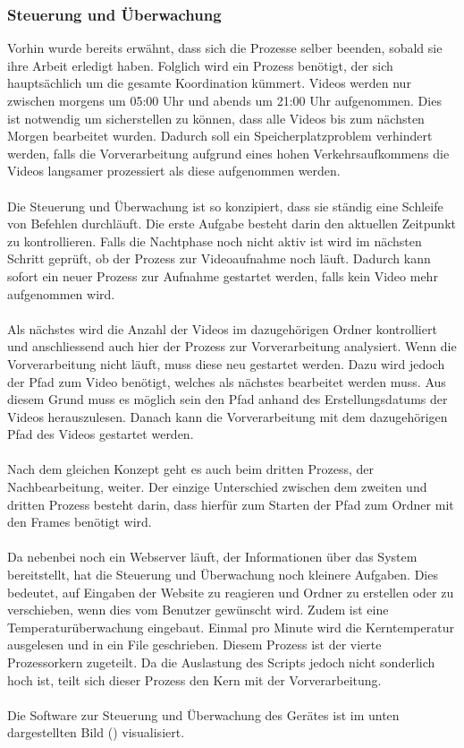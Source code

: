 \subsubsection{Steuerung und Überwachung}
Vorhin wurde bereits erwähnt, dass sich die Prozesse selber beenden, sobald sie ihre Arbeit erledigt haben. Folglich wird ein Prozess benötigt, der sich hauptsächlich um die gesamte Koordination kümmert. Videos werden nur zwischen morgens um 05:00 Uhr und abends um 21:00 Uhr aufgenommen. Dies ist notwendig um sicherstellen zu können, dass alle Videos bis zum nächsten Morgen bearbeitet wurden. Dadurch soll ein Speicherplatzproblem verhindert werden, falls die Vorverarbeitung aufgrund eines hohen Verkehrsaufkommens die Videos langsamer prozessiert als diese aufgenommen werden.\\\\
Die Steuerung und Überwachung ist so konzipiert, dass sie ständig eine Schleife von Befehlen durchläuft. Die erste Aufgabe besteht darin den aktuellen Zeitpunkt zu kontrollieren. Falls die Nachtphase noch nicht aktiv ist wird im nächsten Schritt geprüft, ob der Prozess zur Videoaufnahme noch läuft. Dadurch kann sofort ein neuer Prozess zur Aufnahme gestartet werden, falls kein Video mehr aufgenommen wird.\\\\
Als nächstes wird die Anzahl der Videos im dazugehörigen Ordner kontrolliert und anschliessend auch hier der Prozess zur Vorverarbeitung analysiert. Wenn die Vorverarbeitung nicht läuft, muss diese neu gestartet werden. Dazu wird jedoch der Pfad zum Video benötigt, welches als nächstes bearbeitet werden muss. Aus diesem Grund muss es möglich sein den Pfad anhand des Erstellungsdatums der Videos herauszulesen. Danach kann die Vorverarbeitung mit dem dazugehörigen Pfad des Videos gestartet werden.\\\\
Nach dem gleichen Konzept geht es auch beim dritten Prozess, der Nachbearbeitung, weiter. Der einzige Unterschied zwischen dem zweiten und dritten Prozess besteht darin, dass hierfür zum Starten der Pfad zum Ordner mit den Frames benötigt wird.\\\\
Da nebenbei noch ein Webserver läuft, der Informationen über das System bereitstellt, hat die Steuerung und Überwachung noch kleinere Aufgaben. Dies bedeutet, auf Eingaben der Website zu reagieren und Ordner zu erstellen oder zu verschieben, wenn dies vom Benutzer gewünscht wird. Zudem ist eine Temperaturüberwachung eingebaut. Einmal pro Minute wird die Kerntemperatur ausgelesen und in ein File geschrieben. Diesem Prozess ist der vierte Prozessorkern zugeteilt. Da die Auslastung des Scripts jedoch nicht sonderlich hoch ist, teilt sich dieser Prozess den Kern mit der Vorverarbeitung. \cite{Bash}\\\\
Die Software zur Steuerung und Überwachung des Gerätes ist im unten dargestellten Bild () visualisiert.


